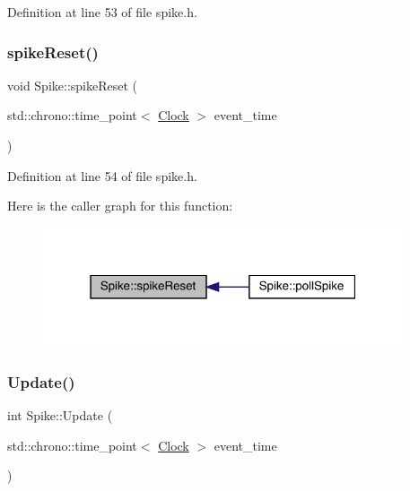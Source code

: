Definition at line 53 of file spike.\+h.

\mbox{\label{class_spike_acce1cc96e84e7cbf3b68010ab32f045e}} 
\subsubsection{\texorpdfstring{spike\+Reset()}{spikeReset()}}
{\footnotesize\ttfamily void Spike\+::spike\+Reset (\begin{DoxyParamCaption}\item[{std\+::chrono\+::time\+\_\+point$<$ \hyperlink{universe_8h_a0ef8d951d1ca5ab3cfaf7ab4c7a6fd80}{Clock} $>$}]{event\+\_\+time }\end{DoxyParamCaption})\hspace{0.3cm}{\ttfamily [inline]}}



Definition at line 54 of file spike.\+h.

Here is the caller graph for this function\+:
\nopagebreak
\begin{figure}[H]
\begin{center}
\leavevmode
\includegraphics[width=301pt]{class_spike_acce1cc96e84e7cbf3b68010ab32f045e_icgraph}
\end{center}
\end{figure}
\mbox{\label{class_spike_a683a0ca5e62e68777381fc85f4bf3019}} 
\subsubsection{\texorpdfstring{Update()}{Update()}}
{\footnotesize\ttfamily int Spike\+::\+Update (\begin{DoxyParamCaption}\item[{std\+::chrono\+::time\+\_\+point$<$ \hyperlink{universe_8h_a0ef8d951d1ca5ab3cfaf7ab4c7a6fd80}{Clock} $>$}]{event\+\_\+time }\end{DoxyParamCaption})}



